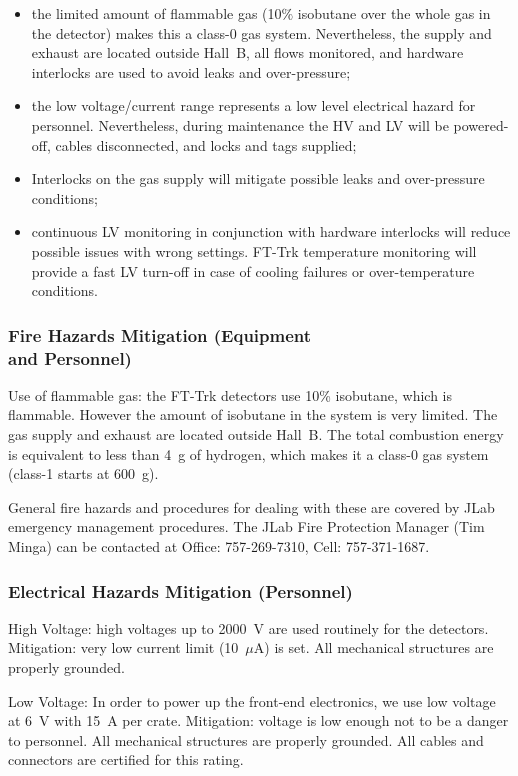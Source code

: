 \begin{itemize}
\item{ the limited amount of flammable gas (10$\%$ isobutane over the whole gas in the detector)  
makes this a class-0 gas system. Nevertheless, the supply and exhaust are located outside 
Hall~B, all flows monitored, and hardware interlocks are used to avoid leaks and over-pressure;}
\item{ the low voltage/current range represents  a low level electrical  hazard for personnel. 
Nevertheless, during maintenance the HV and LV will be powered-off, cables disconnected, and 
locks and tags supplied; }
\item{ Interlocks on the gas supply will mitigate possible leaks and over-pressure conditions;}
\item{ continuous LV monitoring in conjunction with hardware interlocks will reduce possible 
issues with wrong settings. FT-Trk temperature monitoring will provide a fast LV turn-off in 
case of cooling failures or over-temperature conditions. }
\end{itemize}

\subsubsection{Fire Hazards Mitigation (Equipment \\ and Personnel)}

Use of flammable gas: the FT-Trk detectors use 10\% isobutane, which is flammable. 
However the amount of isobutane in the system is very limited. The gas supply and exhaust 
are located outside Hall~B. The total combustion energy is equivalent to less than 4~g of 
hydrogen, which makes it a class-0 gas system (class-1 starts at 600~g). 

General fire hazards and procedures for dealing with these are covered by JLab emergency 
management procedures. The JLab Fire Protection Manager (Tim Minga) can be contacted at 
Office: 757-269-7310, Cell: 757-371-1687.

\subsubsection{Electrical Hazards Mitigation (Personnel)}

High Voltage: high voltages up to 2000~V are used routinely for the detectors. Mitigation: very 
low current limit (10~$\mu$A) is set. All mechanical structures are properly grounded.

Low Voltage: In order to power up the front-end electronics, we use low voltage at 6~V with 15~A 
per crate. Mitigation: voltage is low enough not to be a danger to personnel. All mechanical 
structures are properly grounded. All cables and connectors are certified for this rating.

